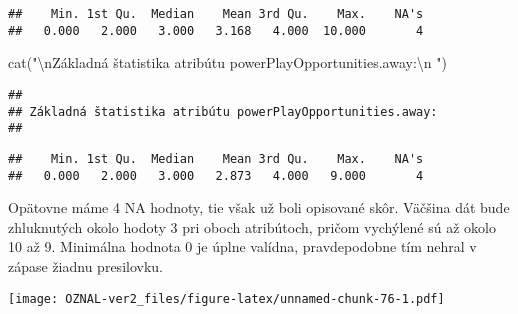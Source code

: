 \documentclass[
]{article}
\newenvironment{Shaded}{\begin{snugshade}}{\end{snugshade}}
\newcommand{\AttributeTok}[1]{\textcolor[rgb]{0.77,0.63,0.00}{#1}}
\newcommand{\FunctionTok}[1]{\textcolor[rgb]{0.00,0.00,0.00}{#1}}
\newcommand{\NormalTok}[1]{#1}
\newcommand{\SpecialCharTok}[1]{\textcolor[rgb]{0.00,0.00,0.00}{#1}}
\newcommand{\StringTok}[1]{\textcolor[rgb]{0.31,0.60,0.02}{#1}}
\begin{document}
\begin{verbatim}
##    Min. 1st Qu.  Median    Mean 3rd Qu.    Max.    NA's 
##   0.000   2.000   3.000   3.168   4.000  10.000       4
\end{verbatim}

\begin{Shaded}
\begin{Highlighting}[]
\FunctionTok{cat}\NormalTok{(}\StringTok{"}\SpecialCharTok{\textbackslash{}n}\StringTok{Základná štatistika atribútu powerPlayOpportunities.away:}\SpecialCharTok{\textbackslash{}n}\StringTok{ "}\NormalTok{)}
\end{Highlighting}
\end{Shaded}

\begin{verbatim}
## 
## Základná štatistika atribútu powerPlayOpportunities.away:
## 
\end{verbatim}

\begin{Shaded}
\end{Shaded}

\begin{verbatim}
##    Min. 1st Qu.  Median    Mean 3rd Qu.    Max.    NA's 
##   0.000   2.000   3.000   2.873   4.000   9.000       4
\end{verbatim}

Opätovne máme 4 NA hodnoty, tie však už boli opisované skôr. Väčšina dát
bude zhluknutých okolo hodoty 3 pri oboch atribútoch, pričom vychýlené
sú až okolo 10 až 9. Minimálna hodnota 0 je úplne valídna, pravdepodobne
tím nehral v zápase žiadnu presilovku.

\begin{Shaded}
\end{Shaded}

\texttt{[image: OZNAL-ver2\_files/figure-latex/unnamed-chunk-76-1.pdf]}

\begin{Shaded}
\end{Shaded}
\end{document}
